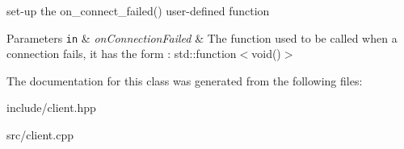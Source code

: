 set-\/up the on\+\_\+connect\+\_\+failed() user-\/defined function 


\begin{DoxyParams}[1]{Parameters}
\mbox{\tt in}  & {\em on\+Connection\+Failed} & The function used to be called when a connection fails, it has the form \+: std\+::function$<$void()$>$ \\
\hline
\end{DoxyParams}


The documentation for this class was generated from the following files\+:\begin{DoxyCompactItemize}
\item 
include/client.\+hpp\item 
src/client.\+cpp\end{DoxyCompactItemize}
